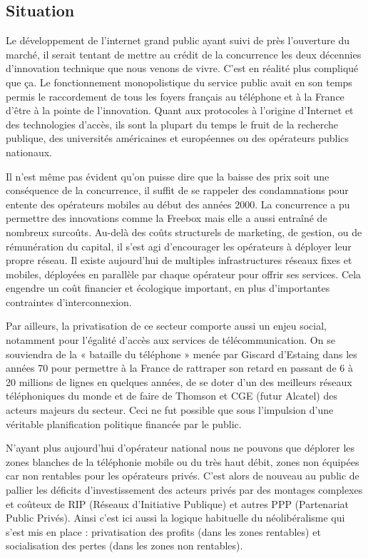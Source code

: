 \documentclass[a4paper]{article}
\begin{document}
\subsection{Situation}
Le développement de l’internet grand public ayant suivi de près l’ouverture du marché, il serait tentant de mettre au crédit de la concurrence les deux décennies d’innovation technique que nous venons de vivre. C’est en réalité plus compliqué que ça. Le fonctionnement monopolistique du service public avait en son temps permis le raccordement de tous les foyers français au téléphone et à la France d’être à la pointe de l’innovation. Quant aux protocoles à l’origine d’Internet et des technologies d’accès, ils sont la plupart du temps le fruit de la recherche publique, des universités américaines et européennes ou des opérateurs publics nationaux. 

Il n’est même pas évident qu’on puisse dire que la baisse des prix soit une conséquence de la concurrence, il suffit de se rappeler des condamnations pour entente des opérateurs mobiles au début des années 2000. La concurrence a pu permettre des innovations comme la Freebox mais elle a aussi entraîné de nombreux surcoûts. Au-delà des coûts structurels de marketing, de gestion, ou de rémunération du capital, il s’est agi d’encourager les opérateurs à déployer leur propre réseau. Il existe aujourd’hui de multiples infrastructures réseaux fixes et mobiles, déployées en parallèle par chaque opérateur pour offrir ses services. Cela engendre un coût financier et écologique important, en plus d’importantes contraintes d’interconnexion.  

Par ailleurs, la privatisation de ce secteur comporte aussi un enjeu social, notamment pour l’égalité d’accès aux services de télécommunication. On se souviendra de la « bataille du téléphone » menée par Giscard d’Estaing dans les années 70 pour permettre à la France de rattraper son retard en passant de 6 à 20 millions de lignes en quelques années, de se doter d’un des meilleurs réseaux téléphoniques du monde et de faire de Thomson et CGE (futur Alcatel) des acteurs majeurs du secteur. Ceci ne fut possible que sous l’impulsion d’une véritable planification politique financée par le public.  

N’ayant plus aujourd’hui d’opérateur national nous ne pouvons que déplorer les zones blanches de la téléphonie mobile ou du très haut débit, zones non équipées car non rentables pour les opérateurs privés. C’est alors de nouveau au public de pallier les déficits d’investissement des acteurs privés par des montages complexes et coûteux de RIP (Réseaux d’Initiative Publique) et autres PPP (Partenariat Public Privés). Ainsi c’est ici aussi la logique habituelle du néolibéralisme qui s’est mis en place : privatisation des profits (dans les zones rentables) et socialisation des pertes (dans les zones non rentables).
\end{document}
